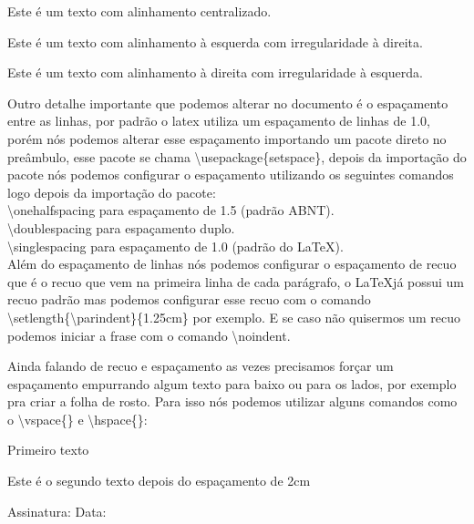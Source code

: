 \begin{center}
    Este é um texto com alinhamento centralizado.
\end{center}

\begin{flushleft}
    Este é um texto com alinhamento à esquerda com irregularidade à direita.
\end{flushleft}

\begin{flushright}
    Este é um texto com alinhamento à direita com irregularidade à esquerda.
\end{flushright}

Outro detalhe importante que podemos alterar no documento é o espaçamento entre as linhas, por padrão o latex utiliza um espaçamento de linhas de 1.0, porém nós podemos alterar esse espaçamento importando um pacote direto no preâmbulo, esse pacote se chama \textbackslash usepackage\{setspace\}, depois da importação do pacote nós podemos configurar o espaçamento utilizando os seguintes comandos logo depois da importação do pacote:\\

\noindent \textbackslash onehalfspacing para espaçamento de 1.5 (padrão ABNT).\\
\textbackslash doublespacing para espaçamento duplo.\\
\textbackslash singlespacing para espaçamento de 1.0 (padrão do \LaTeX).\\

Além do espaçamento de linhas nós podemos configurar o espaçamento de recuo que é o recuo que vem na primeira linha de cada parágrafo, o \LaTeX já possui um recuo padrão mas podemos configurar esse recuo com o comando \textbackslash setlength\{\textbackslash parindent\}\{1.25cm\} por exemplo. E se caso não quisermos um recuo podemos iniciar a frase com o comando \textbackslash noindent.

Ainda falando de recuo e espaçamento as vezes precisamos forçar um espaçamento empurrando algum texto para baixo ou para os lados, por exemplo pra criar a folha de rosto. Para isso nós podemos utilizar alguns comandos como o \textbackslash vspace\{\} e \textbackslash hspace\{\}:

Primeiro texto

\vspace{2cm}
Este é o segundo texto depois do espaçamento de 2cm

Assinatura: \hspace{5cm} Data:

